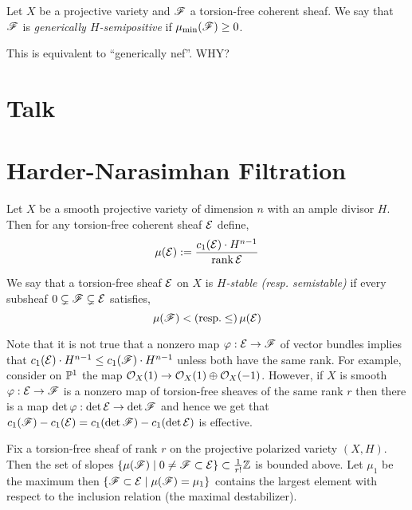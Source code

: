 \documentclass[12pt]{article}
\begin{document}
\begin{defn}
Let $X$ be a projective variety and $\F$ a torsion-free coherent sheaf. We say that $\F$ is \textit{generically $H$-semipositive} if $\mu_{\min}(\F) \ge 0$.
\end{defn}

\begin{rmk}
This is equivalent to ``generically nef''. {\color{red} WHY?}
\end{rmk}

\newpage

\section{Talk}

\section{Harder-Narasimhan Filtration}

Let $X$ be a smooth projective variety of dimension $n$ with an ample divisor $H$. Then for any torsion-free coherent sheaf $\E$ define,
\[ \mu(\E) := \frac{c_1(\E) \cdot H^{n-1}}{\rank{\E}} \]

\begin{defn}
We say that a torsion-free sheaf $\E$ on $X$ is $H$\textit{-stable (resp. semistable)} if every subsheaf $0 \subsetneq \F \subsetneq \E$ satisfies,
\[ \mu(\F) < (\text{resp.} \le) \, \mu(\E) \] 
\end{defn}

\begin{rmk}
Note that it is not true that a nonzero map $\varphi : \E \to \F$ of vector bundles implies that $c_1(\E) \cdot H^{n-1} \le c_1(\F) \cdot H^{n-1}$ unless both have the same rank. For example, consider on $\P^1$ the map $\struct{X}(1) \to \struct{X}(1) \oplus \struct{X}(-1)$. However, if $X$ is smooth $\varphi : \E \to \F$ is a nonzero map of torsion-free sheaves of the same rank $r$ then there is a map $\det{\varphi} : \det{\E} \to \det{\F}$ and hence we get that $c_1(\F) - c_1(\E) = c_1(\det{\F}) - c_1(\det{\E})$ is effective. 
\end{rmk}

\begin{prop}
Fix a torsion-free sheaf of rank $r$ on the projective polarized variety $(X, H)$. Then the set of slopes $\{ \mu(\F) \mid 0 \neq \F \subset \E \} \subset \frac{1}{r!} \Z$ is bounded above. Let $\mu_1$ be the maximum then $\{ \F \subset \E \mid \mu(\F) = \mu_1 \}$ contains the largest element with respect to the inclusion relation (the maximal destabilizer).
\end{prop}
\end{document}
